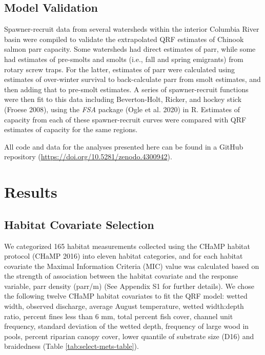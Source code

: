 \documentclass[
  12pt,
]{article}
\begin{document}
\hypertarget{model-validation}{%
\subsection{Model Validation}\label{model-validation}}

Spawner-recruit data from several watersheds within the interior Columbia River basin were compiled to validate the extrapolated QRF estimates of Chinook salmon parr capacity. Some watersheds had direct estimates of parr, while some had estimates of pre-smolts and smolts (i.e., fall and spring emigrants) from rotary screw traps. For the latter, estimates of parr were calculated using estimates of over-winter survival to back-calculate parr from smolt estimates, and then adding that to pre-smolt estimates. A series of spawner-recruit functions were then fit to this data including Beverton-Holt, Ricker, and hockey stick (Froese 2008), using the \emph{FSA} package (Ogle et al. 2020) in R. Estimates of capacity from each of these spawner-recruit curves were compared with QRF estimates of capacity for the same regions.

All code and data for the analyses presented here can be found in a GitHub repository (\url{https://doi.org/10.5281/zenodo.4300942}).

\hypertarget{results}{%
\section{Results}\label{results}}

\hypertarget{habitat-covariate-selection-1}{%
\subsection{Habitat Covariate Selection}\label{habitat-covariate-selection-1}}

We categorized 165 habitat measurements collected using the CHaMP habitat protocol (CHaMP 2016) into eleven habitat categories, and for each habitat covariate the Maximal Information Criteria (MIC) value was calculated based on the strength of association between the habitat covariate and the response variable, parr density (parr/m) (See Appendix S1 for further details). We chose the following twelve CHaMP habitat covariates to fit the QRF model: wetted width, observed discharge, average August temperature, wetted width:depth ratio, percent fines less than 6 mm, total percent fish cover, channel unit frequency, standard deviation of the wetted depth, frequency of large wood in pools, percent riparian canopy cover, lower quantile of substrate size (D16) and braidedness (Table \ref{tab:select-mets-table}).
\end{document}
